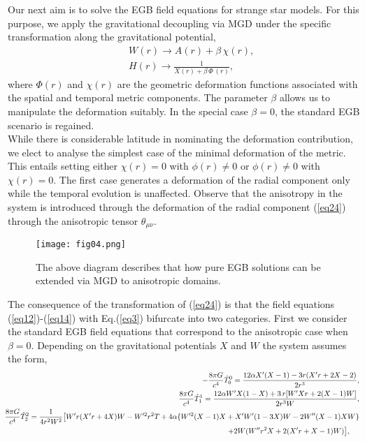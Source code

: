 \documentclass[]{aastex631}
\begin{document}
Our next aim is to solve the EGB field equations for strange star models. For this purpose, we apply the  gravitational decoupling via MGD under the specific transformation along the gravitational potential, 
\begin{eqnarray}
&& W(r) \longrightarrow A(r)+\beta\, \chi(r), \label{eq23}\\
&& H(r) \longrightarrow \frac{1}{X(r)+\beta\, \Phi\,(r)}, \label{eq24}
\end{eqnarray}
where $\Phi(r)$ and $\chi(r)$ are the geometric deformation functions associated with  the spatial and temporal metric components. The parameter $\beta$ allows us to manipulate the  deformation suitably. In  the special case   $\beta =0$, the standard EGB scenario is regained.\\
While there is considerable latitude in nominating the deformation contribution, we elect to analyse the simplest case of the minimal deformation of the metric. This entails setting either $ \chi(r) = 0$ with  $\phi(r)\ne 0$ or $\phi(r)\ne 0$ with $\chi(r) = 0$.  The first case generates a deformation of the radial component only while the temporal evolution is unaffected.  Observe that the anisotropy in the system is introduced through  the  deformation of the radial component (\ref{eq24})  through the  anisotropic tensor $\theta_{\mu\nu}$. 
\begin{figure}
    \centering    
     \texttt{[image: fig04.png]}
    \caption{The above diagram describes that how pure EGB solutions can be extended via MGD to anisotropic domains.}
    \label{fig1}
\end{figure}  
The consequence of the transformation of (\ref{eq24}) is that the field equations (\ref{eq12})-(\ref{eq14}) with Eq.(\ref{eq3}) bifurcate into two categories.  First we consider the standard EGB field equations that correspond to the anisotropic case when $\beta = 0$. Depending on the gravitational potentials $X$ and $W$ the system  assumes the form,
\begin{eqnarray}
&&\hspace{-0.5cm} -\frac{8\pi G }{c^4} \hat{T}^0_0 =\frac{12\alpha X^\prime (X-1)-3 r (X^\prime r+2 X-2)}{2r^3} ,\label{eq25}\\
&&\hspace{-0.5cm} \frac{8\pi G }{c^4} \hat{T}^1_1=\frac{12 \alpha W^\prime X (1- X)+3\,r [W^\prime X r+2(X-1) W]}{2 r^3 W} ,\label{eq26}\\
&&\hspace{-0.5cm}  \frac{8\pi G }{c^4} \hat{T}^2_2=\frac{1}{4r^2W^2}\big[W^\prime r (X^\prime r + 4 X) W -W^{\prime 2} r^2 T + 4 \alpha \{W^{\prime 2} (X-1) X + X^\prime W^\prime (1 - 3 X) W  - 2 W^{\prime\prime} (X-1) X W\}  \nonumber\\
 && \hspace{0.9cm} + 2 W (W^{\prime\prime} r^2 X + 2 (X^\prime r + X-1) W)\big],~~~~\label{eq27} 
\end{eqnarray}
\end{document}
